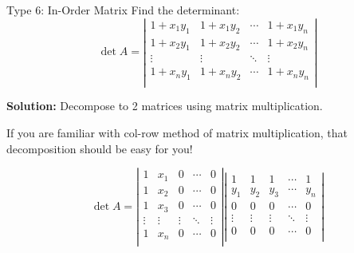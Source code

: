 \documentclass{beamer}
\begin{document}
\begin{frame}{Type 6: In-Order Matrix}
Find the determinant:
\begin{equation*}
    \det A=\left| \begin{matrix}
        1+x_1y_1&		1+x_1y_2&		\cdots&		1+x_1y_n\\
        1+x_2y_1&		1+x_2y_2&		\cdots&		1+x_2y_n\\
        \vdots&		\vdots&		\ddots&		\vdots\\
        1+x_ny_1&		1+x_ny_2&		\cdots&		1+x_ny_n\\
    \end{matrix} \right|
\end{equation*}

\textbf{Solution:} Decompose to 2 matrices using matrix multiplication.

\vspace{3pt}
If you are familiar with col-row method of matrix multiplication, that decomposition should be easy for you!

\begin{equation*}
    \det A=\left| \begin{matrix}
        1&		x_1&		0&		\cdots&		0\\
        1&		x_2&		0&		\cdots&		0\\
        1&		x_3&		0&		\cdots&		0\\
        \vdots&		\vdots&		\vdots&		\ddots&		\vdots\\
        1&		x_n&		0&		\cdots&		0\\
    \end{matrix} \right|\left| \begin{matrix}
        1&		1&		1&		\cdots&		1\\
        y_1&		y_2&		y_3&		\cdots&		y_n\\
        0&		0&		0&		\cdots&		0\\
        \vdots&		\vdots&		\vdots&		\ddots&		\vdots\\
        0&		0&		0&		\cdots&		0\\
    \end{matrix} \right|
\end{equation*}
\end{frame}
\end{document}
